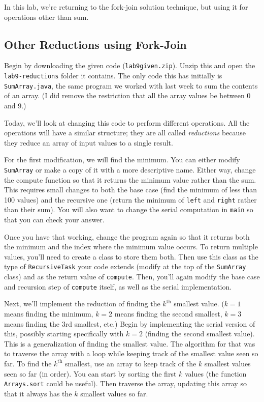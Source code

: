 \documentclass{article}
\begin{document}
In this lab, we're returning to the fork-join solution technique, but
using it for operations other than sum.

\subsection*{Other Reductions using Fork-Join}

Begin by downloading the given code ({\tt lab9given.zip}).
Unzip this and open the {\tt lab9-reductions} folder it contains.
The only code this has initially is {\tt SumArray.java}, the same
program we worked with last week to sum the contents of an array.
(I did remove the restriction that all the array values be between 0
and 9.)

Today, we'll look at changing this code to perform different
operations.
All the operations will have a similar structure; they are all called
{\em reductions} because they reduce an array of input values to a
single result.

For the first modification, we will find the minimum.
You can either modify {\tt SumArray} or make a copy of it with a more
descriptive name.
Either way, change the compute function so that it returns the minimum
value rather than the sum.
This requires small changes to both the base case (find the minimum of
less than 100 values) and the recursive one (return the minimum of
{\tt left} and {\tt right} rather than their sum).
You will also want to change the serial computation in {\tt main} so
that you can check your answer.

Once you have that working, change the program again so that it
returns both the minimum and the index where the minimum value occurs.
To return multiple values, you'll need to create a class to store them
both.
Then use this class as the type of {\tt RecursiveTask} your code
extends (modify at the top of the {\tt SumArray} class) and as the
return value of {\tt compute}.
Then, you'll again modify the base case and recursion step of
{\tt compute} itself, as well as the serial implementation.

Next, we'll implement the reduction of finding the $k^\text{th}$
smallest value.
($k=1$ means finding the minimum, $k=2$ means finding the second
smallest, $k=3$ means finding the 3rd smallest, etc.)
Begin by implementing the serial version of this, possibly starting
specifically with $k=2$ (finding the second smallest value).
This is a generalization of finding the smallest value.
The algorithm for that was to traverse the array with a loop while
keeping track of the smallest value seen so far.
To find the $k^\text{th}$ smallest, use an array to keep track of the
$k$ smallest values seen so far (in order).
You can start by sorting the first $k$ values (the function
{\tt Arrays.sort} could be useful).
Then traverse the array, updating this array so that it always has the
$k$ smallest values so far.
\end{document}
